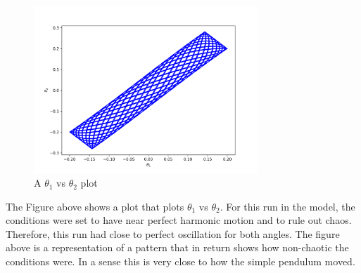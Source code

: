 \documentclass[runningheads]{llncs}
\begin{document}
\begin{figure}[h]
    \centering
    \includegraphics[width=0.75\textwidth]{img/simple_pendulum_thetas_non_chaos.png}
    \caption{A $\theta_1$ vs $\theta_2$ plot}
    \label{fig:theta_vs_theta}
\end{figure}
 
 The Figure above shows a plot that plots $\theta_1$ vs $\theta_2$. For this run in the model, the conditions were set to have near perfect harmonic motion and to rule out chaos. Therefore, this run had close to perfect oscillation for both angles. The figure above is a representation of a pattern that in return shows how non-chaotic the conditions were. In a sense this is very close to how the simple pendulum moved. 
\end{document}
